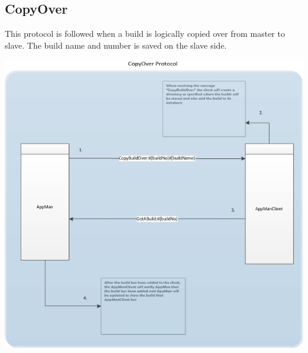 \documentclass[a4paper,12pt,final]{article}
\begin{document}
\subsection{CopyOver}
This protocol is followed when a build is logically copied over from master to slave. The build name and number is saved on the slave side. 
\begin{center}
\includegraphics[scale=0.85]{CommunicationProtocol/CopyOverProtocol.jpg} 
\end{center}
\end{document}
